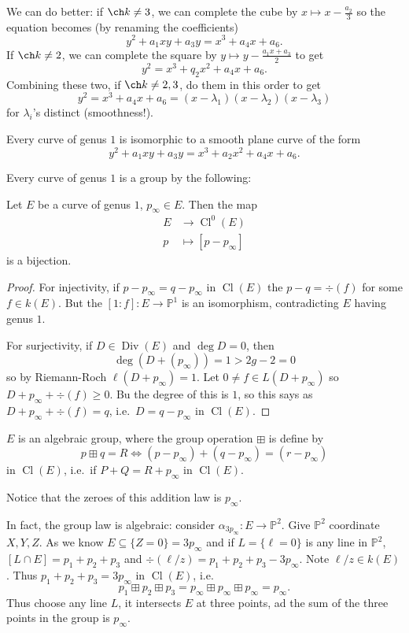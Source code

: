 \documentclass[a4paper]{article}
\DeclareMathOperator{\Cl}{Cl}
\renewcommand*{\P}{\mathbb{P}}
\DeclareMathOperator{\Div}{Div} %
\begin{document}
We can do better: if \(\ch k \neq 3\), we can complete the cube by \(x \mapsto x - \frac{a_2}{3}\) so the equation becomes (by renaming the coefficients)
\[
  y^2 + a_1xy + a_3y = x^3 + a_4x + a_6.
\]
If \(\ch k \neq 2\), we can complete the square by \(y \mapsto y - \frac{a_1x + a_3}{2}\) to get
\[
  y^2 = x^3 + q_2x^2 + a_4x + a_6.
\]
Combining these two, if \(\ch k \neq 2, 3\), do them in this order to get
\[
  y^2 = x^3 + a_4x + a_6 = (x - \lambda_1)(x - \lambda_2)(x - \lambda_3)
\]
for \(\lambda_i\)'s distinct (smoothness!).

\begin{theorem}
  Every curve of genus \(1\) is isomorphic to a smooth plane curve of the form
  \[
    y^2 + a_1xy + a_3y = x^3 + a_2x^2 + a_4x + a_6.
  \]
\end{theorem}

Every curve of genus \(1\) is a group by the following:
\begin{proposition}
  Let \(E\) be a curve of genus \(1\), \(p_\infty \in E\). Then the map
  \begin{align*}
    E &\to \Cl^0(E) \\
    p &\mapsto [p - p_\infty]
  \end{align*}
  is a bijection.
\end{proposition}

\begin{proof}
  For injectivity, if \(p - p_\infty = q - p_\infty\) in \(\Cl(E)\) the \(p - q = \div (f)\) for some \(f \in k(E)\). But the \([1:f]: E \to \P^1\) is an isomorphism, contradicting \(E\) having genus \(1\).

  For surjectivity, if \(D \in \Div(E)\) and \(\deg D = 0\), then
  \[
    \deg(D + (p_\infty)) = 1 > 2g - 2 = 0
  \]
  so by Riemann-Roch \(\ell(D + p_\infty) = 1\). Let \(0 \neq f \in L(D + p_\infty)\) so \(D + p_\infty + \div (f) \geq 0\). Bu the degree of this is \(1\), so this says as \(D + p_\infty + \div(f) = q\), i.e.\ \(D = q - p_\infty\) in \(\Cl(E)\).
\end{proof}

\begin{corollary}
  \(E\) is an algebraic group, where the group operation \(\boxplus\) is define by
  \[
    p \boxplus q = R \iff (p - p_\infty) + (q - p_\infty) = (r - p_\infty)
  \]
  in \(\Cl(E)\), i.e.\ if \(P + Q = R + p_\infty\) in \(\Cl(E)\).
\end{corollary}
Notice that the zeroes of this addition law is \(p_\infty\).

In fact, the group law is algebraic: consider \(\alpha_{3p_\infty}: E \to \P^2\). Give \(\P^2\) coordinate \(X, Y, Z\). As we know \(E \subseteq \{Z = 0\} = 3p_\infty\) and if \(L = \{\ell = 0\}\) is any line in \(\P^2\), \([L \cap E] = p_1 + p_2 + p_3\) and \(\div(\ell/z) = p_1 + p_2 + p_3 - 3p_\infty\). Note \(\ell/z \in k(E)\). Thus \(p_1 + p_2 + p_3 = 3p_\infty\) in \(\Cl(E)\), i.e.
\[
  p_1 \boxplus p_2 \boxplus p_3 = p_\infty \boxplus p_\infty \boxplus p_\infty = p_\infty.
\]
Thus choose any line \(L\), it intersects \(E\) at three points, ad the sum of the three points in the group is \(p_\infty\).
\end{document}
